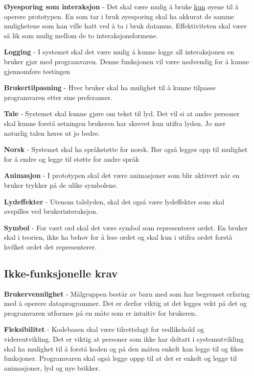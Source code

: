  
\textbf{Øyesporing som interaksjon} - Det skal være mulig å bruke \underline{kun} øyene til å operere prototypen. En som tar i bruk øyesporing skal ha akkurat de samme mulighetene som han ville hatt ved å ta i bruk datamus. Effektiviteten skal være så lik som mulig mellom de to interaksjonsformene. 
 
\textbf{Logging} - I systemet skal det være mulig å kunne logge all interaksjonen en bruker gjør med programvaren. Denne funksjonen vil være nødvendig for å kunne gjennomføre testingen 
 
\textbf{Brukertilpasning} - Hver bruker skal ha mulighet til å kunne tilpasse programvaren etter sine preferanser. 
  
\textbf{Tale} - Systemet skal kunne gjøre om tekst til lyd. Det vil si at andre personer skal kunne forstå setningen brukeren har skrevet kun utifra lyden. Jo mer naturlig talen høres ut jo bedre.
  
\textbf{Norsk} - Systemet skal ha språkstøtte for norsk. Bør også legges opp til mulighet for å endre og legge til støtte for andre språk 
 
\textbf{Animasjon} - I prototypen skal det være animasjoner som blir aktivert når en bruker trykker på de ulike symbolene.  

\textbf{Lydeffekter} - Utenom talelyden, skal det også være lydeffekter som skal avspilles ved brukerinteraksjon.  
 
\textbf{Symbol} - For vært ord skal det være symbol som representerer ordet. En bruker skal i teorien, ikke ha behov for å lese ordet og skal kun i utifra ordet forstå hvilket ordet det representerer. 


 
\subsection{Ikke-funksjonelle krav} 
 
\textbf{Brukervennlighet} - Målgruppen består av barn med som har begrenset erfaring med å operere dataprogrammer. Det er derfor viktig at det legges vekt på det og programvaren utformes på en måte som er intuitiv for brukeren.   
 
\textbf{Fleksibilitet} - Kodebasen skal være tilrettelagt for vedlikehold og videreutvikling. Det er viktig at personer som ikke har deltatt i systemutvikling skal ha mulighet til å forstå koden og på den måten enkelt kan legge til og fikse funksjoner. Programvaren skal også legge oppp til at det er enkelt og legge til animasjoner, lyd og nye brikker. 
 
